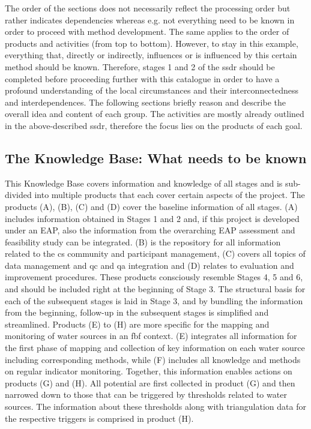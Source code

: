The order of the sections does not necessarily reflect the processing order but rather indicates dependencies whereas e.g. not everything need to be known in order to proceed with method development. The same applies to the order of products and activities (from top to bottom). However, to stay in this example, everything that, directly or indirectly, influences or is influenced by this certain method should be known. Therefore, stages 1 and 2 of the \acrshort{ssdr} should be completed before proceeding further with this catalogue in order to have a profound understanding of the local circumstances and their interconnectedness and interdependences.\newline
The following sections briefly reason and describe the overall idea and content of each group. The activities are mostly already outlined in the above-described \acrshort{ssdr}, therefore the focus lies on the products of each goal. 

\subsection{The Knowledge Base: What needs to be known}\label{subsubsec:knowledge}

This Knowledge Base covers information and knowledge of all stages and is sub-divided into multiple products that each cover certain aspects of the project. The products (A), (B), (C) and (D) cover the baseline information of all stages. (A) includes information obtained in Stages 1 and 2 and, if this project is developed under an EAP, also the information from the overarching EAP assessment and feasibility study can be integrated. (B) is the repository for all information related to the \acrlong{cs} community and participant management, (C) covers all topics of data management and \acrshort{qc} and \acrshort{qa} integration and (D) relates to evaluation and improvement procedures. These products consciously resemble Stages 4, 5 and 6, and should be included right at the beginning of Stage 3. The structural basis for each of the subsequent stages is laid in Stage 3, and by bundling the information from the beginning, follow-up in the subsequent stages is simplified and streamlined.\newline
Products (E) to (H) are more specific for the mapping and monitoring of water sources in an \acrshort{fbf} context. (E) integrates all information for the first phase of mapping and collection of key information on each water source including corresponding methods, while (F) includes all knowledge and methods on regular indicator monitoring. Together, this information enables actions on products (G) and (H). All potential  are first collected in product (G) and then narrowed down to those that can be triggered by thresholds related to water sources. The information about these thresholds along with triangulation data for the respective triggers is comprised in product (H).


